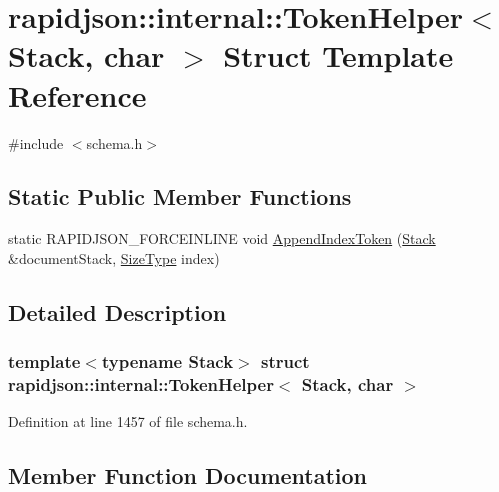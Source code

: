 \hypertarget{structrapidjson_1_1internal_1_1_token_helper_3_01_stack_00_01char_01_4}{}\section{rapidjson\+::internal\+::Token\+Helper$<$ Stack, char $>$ Struct Template Reference}
\label{structrapidjson_1_1internal_1_1_token_helper_3_01_stack_00_01char_01_4}


{\ttfamily \#include $<$schema.\+h$>$}

\subsection*{Static Public Member Functions}
\begin{DoxyCompactItemize}
\item 
static R\+A\+P\+I\+D\+J\+S\+O\+N\+\_\+\+F\+O\+R\+C\+E\+I\+N\+L\+I\+NE void \mbox{\hyperlink{structrapidjson_1_1internal_1_1_token_helper_3_01_stack_00_01char_01_4_ab877a126e0b798bfc149d9506aed999e}{Append\+Index\+Token}} (\mbox{\hyperlink{classrapidjson_1_1internal_1_1_stack}{Stack}} \&document\+Stack, \mbox{\hyperlink{namespacerapidjson_a44eb33eaa523e36d466b1ced64b85c84}{Size\+Type}} index)
\end{DoxyCompactItemize}


\subsection{Detailed Description}
\subsubsection*{template$<$typename Stack$>$\newline
struct rapidjson\+::internal\+::\+Token\+Helper$<$ Stack, char $>$}



Definition at line 1457 of file schema.\+h.



\subsection{Member Function Documentation}
\mbox{\label{structrapidjson_1_1internal_1_1_token_helper_3_01_stack_00_01char_01_4_ab877a126e0b798bfc149d9506aed999e}} 
